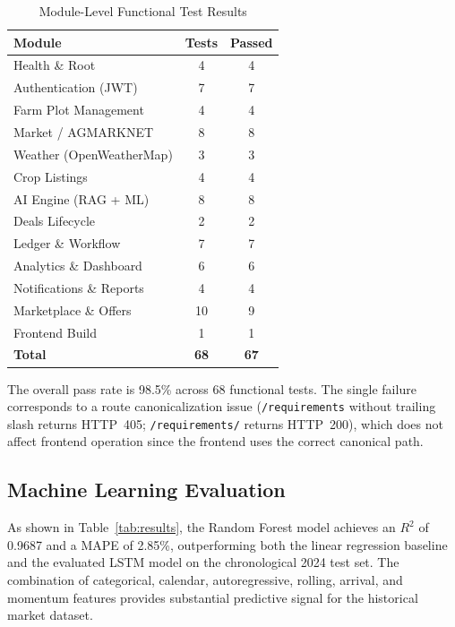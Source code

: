\documentclass[conference]{IEEEtran}
\begin{document}
\begin{table}[htbp]
\centering
\caption{Module-Level Functional Test Results}
\label{tab:tests}
\begin{tabular}{lcc}
\toprule
\textbf{Module} & \textbf{Tests} & \textbf{Passed} \\
\midrule
Health \& Root            &  4 &  4 \\
Authentication (JWT)      &  7 &  7 \\
Farm Plot Management      &  4 &  4 \\
Market / AGMARKNET        &  8 &  8 \\
Weather (OpenWeatherMap)  &  3 &  3 \\
Crop Listings             &  4 &  4 \\
AI Engine (RAG + ML)      &  8 &  8 \\
Deals Lifecycle           &  2 &  2 \\
Ledger \& Workflow        &  7 &  7 \\
Analytics \& Dashboard    &  6 &  6 \\
Notifications \& Reports  &  4 &  4 \\
Marketplace \& Offers     & 10 &  9 \\
Frontend Build            &  1 &  1 \\
\midrule
\textbf{Total}            & \textbf{68} & \textbf{67} \\
\bottomrule
\end{tabular}
\end{table}

The overall pass rate is 98.5\% across 68 functional tests. The
single failure corresponds to a route canonicalization issue
(\texttt{/requirements} without trailing slash returns HTTP~405;
\texttt{/requirements/} returns HTTP~200), which does not affect
frontend operation since the frontend uses the correct canonical
path.

\subsection{Machine Learning Evaluation}

As shown in Table~\ref{tab:results}, the Random Forest model achieves
an $R^2$ of 0.9687 and a MAPE of 2.85\%, outperforming both the
linear regression baseline and the evaluated LSTM model on the
chronological 2024 test set. The combination of categorical,
calendar, autoregressive, rolling, arrival, and momentum features
provides substantial predictive signal for the historical market
dataset.
\end{document}
